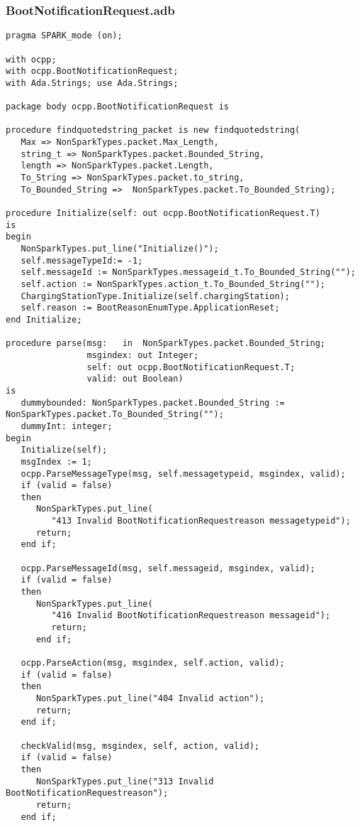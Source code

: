 \documentclass[12pt,openany,a4paper]{book}
\begin{document}
\subsubsection{BootNotificationRequest.adb}
\begin{verbatim}
pragma SPARK_mode (on); 

with ocpp;
with ocpp.BootNotificationRequest;
with Ada.Strings; use Ada.Strings;

package body ocpp.BootNotificationRequest is 

procedure findquotedstring_packet is new findquotedstring(
   Max => NonSparkTypes.packet.Max_Length, 
   string_t => NonSparkTypes.packet.Bounded_String, 
   length => NonSparkTypes.packet.Length,
   To_String => NonSparkTypes.packet.to_string,
   To_Bounded_String =>  NonSparkTypes.packet.To_Bounded_String);

procedure Initialize(self: out ocpp.BootNotificationRequest.T)
is
begin
   NonSparkTypes.put_line("Initialize()");
   self.messageTypeId:= -1;
   self.messageId := NonSparkTypes.messageid_t.To_Bounded_String("");
   self.action := NonSparkTypes.action_t.To_Bounded_String("");
   ChargingStationType.Initialize(self.chargingStation);
   self.reason := BootReasonEnumType.ApplicationReset;
end Initialize;

procedure parse(msg:   in  NonSparkTypes.packet.Bounded_String;
                msgindex: out Integer;
                self: out ocpp.BootNotificationRequest.T;
                valid: out Boolean)
is
   dummybounded: NonSparkTypes.packet.Bounded_String := NonSparkTypes.packet.To_Bounded_String("");
   dummyInt: integer;
begin
   Initialize(self);
   msgIndex := 1;
   ocpp.ParseMessageType(msg, self.messagetypeid, msgindex, valid);
   if (valid = false) 
   then 
      NonSparkTypes.put_line(
         "413 Invalid BootNotificationRequestreason messagetypeid"); 
      return; 
   end if;

   ocpp.ParseMessageId(msg, self.messageid, msgindex, valid);
   if (valid = false) 
   then 
      NonSparkTypes.put_line(
         "416 Invalid BootNotificationRequestreason messageid"); 
         return; 
      end if;

   ocpp.ParseAction(msg, msgindex, self.action, valid);
   if (valid = false) 
   then 
      NonSparkTypes.put_line("404 Invalid action"); 
      return; 
   end if; 

   checkValid(msg, msgindex, self, action, valid);
   if (valid = false) 
   then 
      NonSparkTypes.put_line("313 Invalid BootNotificationRequestreason"); 
      return; 
   end if;


\end{verbatim}
\end{document}
